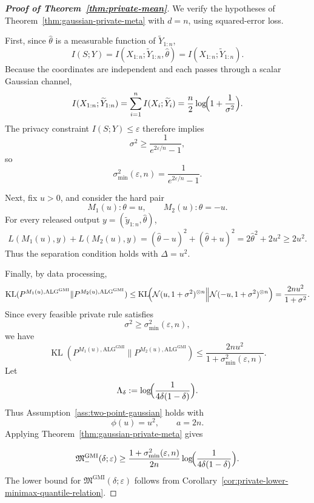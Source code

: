 \documentclass[journal]{IEEEtran}
\newcommand{\ALG}{\mathrm{ALG}}
\newcommand{\KL}{\operatorname{KL}}
\begin{document}
\begin{proof}[\textbf{Proof of Theorem~\ref{thm:private-mean}}]
We verify the hypotheses of Theorem~\ref{thm:gaussian-private-meta} with
\(d=n\), using squared-error loss.

First, since \(\hat\theta\) is a measurable function of
\(\widetilde Y_{1:n}\),
\[
I(S;Y)
=
I(X_{1:n};\widetilde Y_{1:n},\hat\theta)
=
I(X_{1:n};\widetilde Y_{1:n}).
\]
Because the coordinates are independent and each passes through a scalar
Gaussian channel,
\[
I(X_{1:n};\widetilde Y_{1:n})
=
\sum_{i=1}^n I(X_i;\widetilde Y_i)
=
\frac n2\log\!\Bigl(1+\frac{1}{\sigma^2}\Bigr).
\]
The privacy constraint \(I(S;Y)\le\varepsilon\) therefore implies
\[
\sigma^2\ge \frac{1}{e^{2\varepsilon/n}-1},
\]
so
\[
\sigma_{\min}^2(\varepsilon,n)
=
\frac{1}{e^{2\varepsilon/n}-1}.
\]

Next, fix \(u>0\), and consider the hard pair
\[
M_1(u):\theta=u,
\qquad
M_2(u):\theta=-u.
\]
For every released output \(y=(\widetilde y_{1:n},\hat\theta)\),
\[
L(M_1(u),y)+L(M_2(u),y)=
(\hat\theta-u)^2+(\hat\theta+u)^2
=
2\hat\theta^2+2u^2
\ge 2u^2.
\]
Thus the separation condition holds with \(\Delta=u^2\).

Finally, by data processing,
\[
\KL(P^{M_1(u),\ALG^{\mathrm{GMI}}}\|P^{M_2(u),\ALG^{\mathrm{GMI}}})
\le
\KL\!\Bigl(
\mathcal N(u,1+\sigma^2)^{\otimes n}
\Big\|
\mathcal N(-u,1+\sigma^2)^{\otimes n}
\Bigr)
=
\frac{2nu^2}{1+\sigma^2}.
\]
Since every feasible private rule satisfies
\[
\sigma^2\ge \sigma_{\min}^2(\varepsilon,n),
\]
we have
\[
\KL(P^{M_1(u),\ALG^{\mathrm{GMI}}}\|P^{M_2(u),\ALG^{\mathrm{GMI}}})
\le
\frac{2nu^2}{1+\sigma_{\min}^2(\varepsilon,n)}.
\]
Let
\[
\Lambda_\delta
:=
\log\!\Bigl(\frac{1}{4\delta(1-\delta)}\Bigr).
\]
Thus Assumption~\ref{ass:two-point-gaussian} holds with
\[
\phi(u)=u^2,
\qquad
a=2n.
\]
Applying Theorem~\ref{thm:gaussian-private-meta} gives 

\[
\mathfrak M^{\mathrm{GMI}}_-(\delta;\varepsilon)
\ge
\frac{1+\sigma_{\min}^2(\varepsilon,n)}{2n}
\log\!\Bigl(\frac{1}{4\delta(1-\delta)}\Bigr).
\]
The lower bound for \(\mathfrak M^{\mathrm{GMI}}(\delta;\varepsilon)\) follows from
Corollary~\ref{cor:private-lower-minimax-quantile-relation}.
\end{proof}
\end{document}
